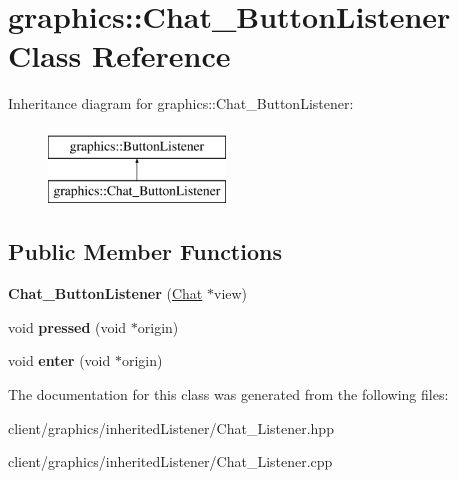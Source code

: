 \hypertarget{classgraphics_1_1_chat___button_listener}{\section{graphics\-:\-:Chat\-\_\-\-Button\-Listener Class Reference}
\label{classgraphics_1_1_chat___button_listener}
}
Inheritance diagram for graphics\-:\-:Chat\-\_\-\-Button\-Listener\-:\begin{figure}[H]
\begin{center}
\leavevmode
\includegraphics[height=2.000000cm]{classgraphics_1_1_chat___button_listener}
\end{center}
\end{figure}
\subsection*{Public Member Functions}
\begin{DoxyCompactItemize}
\item 
\hypertarget{classgraphics_1_1_chat___button_listener_aba6d186cb375ae66eeb8134c79b0e9ae}{{\bfseries Chat\-\_\-\-Button\-Listener} (\hyperlink{classgraphics_1_1_chat}{Chat} $\ast$view)}\label{classgraphics_1_1_chat___button_listener_aba6d186cb375ae66eeb8134c79b0e9ae}

\item 
\hypertarget{classgraphics_1_1_chat___button_listener_afe53c4e6fe2d2f515ae6e97d70c85f99}{void {\bfseries pressed} (void $\ast$origin)}\label{classgraphics_1_1_chat___button_listener_afe53c4e6fe2d2f515ae6e97d70c85f99}

\item 
\hypertarget{classgraphics_1_1_chat___button_listener_a5710d0c606dbc54eda81274fce51261e}{void {\bfseries enter} (void $\ast$origin)}\label{classgraphics_1_1_chat___button_listener_a5710d0c606dbc54eda81274fce51261e}

\end{DoxyCompactItemize}


The documentation for this class was generated from the following files\-:\begin{DoxyCompactItemize}
\item 
client/graphics/inherited\-Listener/Chat\-\_\-\-Listener.\-hpp\item 
client/graphics/inherited\-Listener/Chat\-\_\-\-Listener.\-cpp\end{DoxyCompactItemize}
